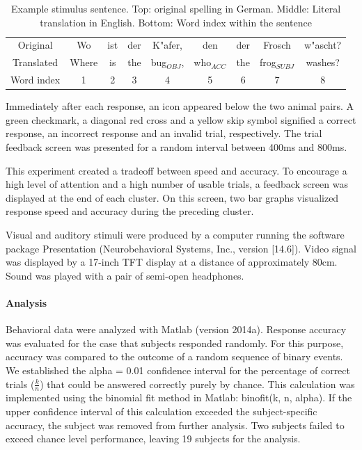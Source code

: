 \vspace{5mm}
\begin{table}[htb]
\begin{center}
\begin{tabular}{c|cccccccc}
Original & Wo & ist & der & K"afer, & den & der & Frosch & w"ascht?\\
Translated & Where & is & the & bug$_{OBJ}$, & who$_{ACC}$ & the & frog$_{SUBJ}$ & washes?\\
Word index & 1 & 2 & 3 & 4 & 5 & 6 & 7 & 8
\end{tabular}
\caption{\label{2.sentences} Example stimulus sentence. Top: original spelling in German. Middle: Literal translation in English. Bottom: Word index within the sentence}
\end{center}
\end{table}
\vspace{5mm}

Immediately after each response, an icon appeared below the two animal pairs.
A green checkmark, a diagonal red cross and a yellow skip symbol signified a correct response, an incorrect response and an invalid trial, respectively.
The trial feedback screen was presented for a random interval between 400ms and 800ms.

This experiment created a tradeoff between speed and accuracy.
To encourage a high level of attention and a high number of usable trials, a feedback screen was displayed at the end of each cluster.
On this screen, two bar graphs visualized response speed and accuracy during the preceding cluster.

Visual and auditory stimuli were produced by a computer running the software package Presentation (Neurobehavioral Systems, Inc., version [14.6]).
Video signal was displayed by a 17-inch TFT display at a distance of approximately 80cm.
Sound was played with a pair of semi-open headphones.


\paragraph{Analysis}

Behavioral data were analyzed with Matlab (version 2014a).
Response accuracy was evaluated for the case that subjects responded randomly.
For this purpose, accuracy was compared to the outcome of a random sequence of binary events.
We established the alpha = 0.01 confidence interval for the percentage of correct trials ($\frac{k}{n}$) that could be answered correctly purely by chance.
This calculation was implemented using the binomial fit method in Matlab: binofit(k, n, alpha).
If the upper confidence interval of this calculation exceeded the subject-specific accuracy, the subject was removed from further analysis.
Two subjects failed to exceed chance level performance, leaving 19 subjects for the analysis.

